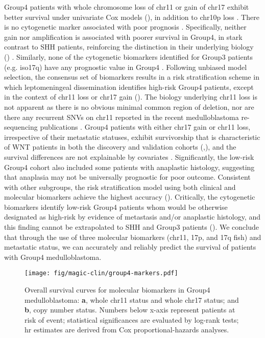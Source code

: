 Group4 patients with whole chromosome loss of chr11 or gain of chr17 exhibit better survival under univariate Cox models (), in addition to chr10p loss . There is no cytogenetic marker associated with poor prognosis . Specifically, neither  gain nor amplification is associated with poorer survival in Group4, in stark contrast to SHH patients, reinforcing the distinction in their underlying biology () . Similarly, none of the cytogenetic biomarkers identified for Group3 patients (e.g. iso17q) have any prognostic value in Group4 . Following unbiased model selection, the consensus set of biomarkers results in a risk stratification scheme in which leptomeningeal dissemination identifies high-risk Group4 patients, except in the context of chr11 loss or chr17 gain (). The biology underlying chr11 loss is not apparent as there is no obvious minimal common region of deletion, nor are there any recurrent SNVs on chr11 reported in the recent medulloblastoma re-sequencing publications . Group4 patients with either chr17 gain or chr11 loss, irrespective of their metastatic statuses, exhibit survivorship that is characteristic of WNT patients in both the discovery and validation cohorts (,), and the survival differences are not explainable by covariates . Significantly, the low-risk Group4 cohort also included some patients with anaplastic histology, suggesting that anaplasia may not be universally prognostic for poor outcome. Consistent with other subgroups, the risk stratification model using both clinical and molecular biomarkers achieve the highest accuracy (). Critically, the cytogenetic biomarkers identify low-risk Group4 patients whom would be otherwise designated as high-risk by evidence of metastasis and/or anaplastic histology, and this finding cannot be extrapolated to SHH and Group3 patients (). We conclude that through the use of three molecular biomarkers (chr11, 17p, and 17q \gls{fish}) and metastatic status, we can accurately and reliably predict the survival of patients with Group4 medulloblastoma.

\bigskip

\begin{figure}[h]
	\begin{center}
		\texttt{[image: fig/magic-clin/group4-markers.pdf]}
	\end{center}
	\caption[Overall survival curves for molecular biomarkers in Group4 medulloblastoma]
	{
	Overall survival curves for molecular biomarkers in Group4 medulloblastoma:
	\textbf{a}, whole chr11 status and whole chr17 status; and
	\textbf{b},  copy number status.
	Numbers below x-axis represent patients at risk of event; statistical significances are evaluated by log-rank tests; \gls{hr} estimates are derived from Cox proportional-hazards analyses.
	}
	\label{fig:group4-markers}
\end{figure}

